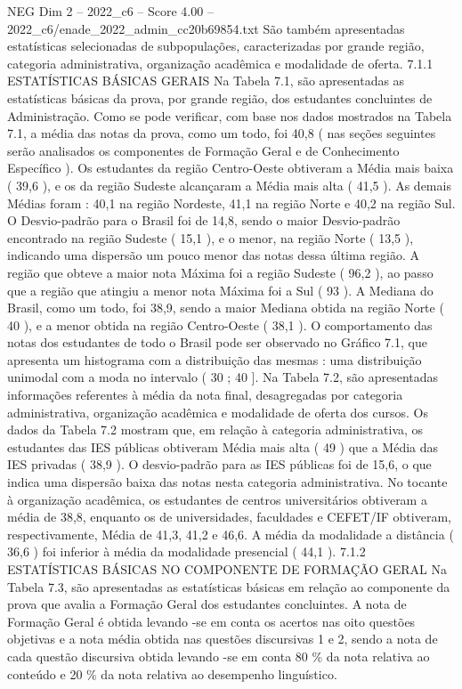 \begin{textsample}{NEG Dim 2 – 2022\_c6 – Score 4.00 – 2022\_c6/enade\_2022\_admin\_cc20b69854.txt}
São também apresentadas estatísticas selecionadas de subpopulações, caracterizadas por grande região, categoria administrativa, organização acadêmica e modalidade de oferta. 7.1.1 ESTATÍSTICAS BÁSICAS GERAIS Na Tabela 7.1, são apresentadas as estatísticas básicas da prova, por grande região, dos estudantes concluintes de Administração.
Como se pode verificar, com base nos dados mostrados na Tabela 7.1, a média das notas da prova, como um todo, foi 40,8 ( nas seções seguintes serão analisados os componentes de Formação Geral e de Conhecimento Específico ).
Os estudantes da região Centro-Oeste obtiveram a Média mais baixa ( 39,6 ), e os da região Sudeste alcançaram a Média mais alta ( 41,5 ).
As demais Médias foram : 40,1 na região Nordeste, 41,1 na região Norte e 40,2 na região Sul.
O Desvio-padrão para o Brasil foi de 14,8, sendo o maior Desvio-padrão encontrado na região Sudeste ( 15,1 ), e o menor, na região Norte ( 13,5 ), indicando uma dispersão um pouco menor das notas dessa última região.
A região que obteve a maior nota Máxima foi a região Sudeste ( 96,2 ), ao passo que a região que atingiu a menor nota Máxima foi a Sul ( 93 ).
A Mediana do Brasil, como um todo, foi 38,9, sendo a maior Mediana obtida na região Norte ( 40 ), e a menor obtida na região Centro-Oeste ( 38,1 ).
O comportamento das notas dos estudantes de todo o Brasil pode ser observado no Gráfico 7.1, que apresenta um histograma com a distribuição das mesmas : uma distribuição unimodal com a moda no intervalo ( 30 ; 40 ].
Na Tabela 7.2, são apresentadas informações referentes à média da nota final, desagregadas por categoria administrativa, organização acadêmica e modalidade de oferta dos cursos.
Os dados da Tabela 7.2 mostram que, em relação à categoria administrativa, os estudantes das IES públicas obtiveram Média mais alta ( 49 ) que a Média das IES privadas ( 38,9 ).
O desvio-padrão para as IES públicas foi de 15,6, o que indica uma dispersão baixa das notas nesta categoria administrativa.
No tocante à organização acadêmica, os estudantes de centros universitários obtiveram a média de 38,8, enquanto os de universidades, faculdades e CEFET/IF obtiveram, respectivamente, Média de 41,3, 41,2 e 46,6.
A média da modalidade a distância ( 36,6 ) foi inferior à média da modalidade presencial ( 44,1 ). 7.1.2 ESTATÍSTICAS BÁSICAS NO COMPONENTE DE FORMAÇÃO GERAL Na Tabela 7.3, são apresentadas as estatísticas básicas em relação ao componente da prova que avalia a Formação Geral dos estudantes concluintes.
A nota de Formação Geral é obtida levando -se em conta os acertos nas oito questões objetivas e a nota média obtida nas questões discursivas 1 e 2, sendo a nota de cada questão discursiva obtida levando -se em conta 80 \% da nota relativa ao conteúdo e 20 \% da nota relativa ao desempenho linguístico.

\end{textsample}
